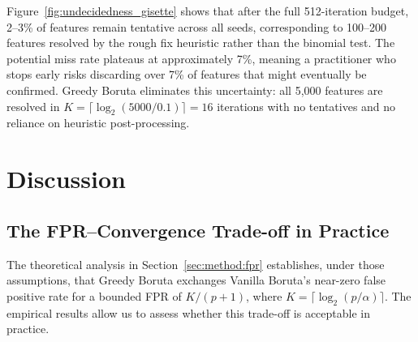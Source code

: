 \documentclass[runningheads]{llncs}
\begin{document}
Figure~\ref{fig:undecidedness_gisette} shows that after the full 512-iteration budget, 2--3\% of features remain tentative across all seeds, corresponding to 100--200 features resolved by the rough fix heuristic rather than the binomial test. The potential miss rate plateaus at approximately 7\%, meaning a practitioner who stops early risks discarding over 7\% of features that might eventually be confirmed. Greedy Boruta eliminates this uncertainty: all 5{,}000 features are resolved in $K = \lceil \log_2(5000/0.1) \rceil = 16$ iterations with no tentatives and no reliance on heuristic post-processing.

 

\section{Discussion}
\label{sec:discussion}

\subsection{The FPR--Convergence Trade-off in Practice}
\label{sec:discussion:tradeoff}

The theoretical analysis in Section~\ref{sec:method:fpr} establishes, under those assumptions, that Greedy Boruta exchanges Vanilla Boruta's near-zero false positive rate for a bounded FPR of $K/(p+1)$, where $K = \lceil \log_2(p/\alpha) \rceil$. The empirical results allow us to assess whether this trade-off is acceptable in practice. 
\end{document}
